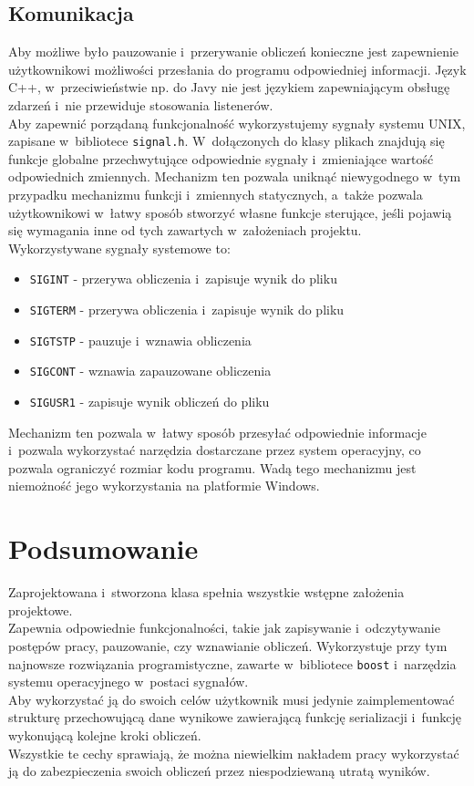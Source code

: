 \documentclass[a4paper]{article}
\begin{document}
\subsection{Komunikacja}
Aby możliwe było pauzowanie i~przerywanie obliczeń konieczne jest zapewnienie użytkownikowi możliwości przesłania do programu odpowiedniej informacji.
Język C++, w~przeciwieństwie np. do Javy nie jest językiem zapewniającym obsługę zdarzeń i~nie przewiduje stosowania listenerów.\\
Aby zapewnić porządaną funkcjonalność wykorzystujemy sygnały systemu UNIX, zapisane w~bibliotece \texttt{signal.h}.
W~dołączonych do klasy plikach znajdują się funkcje globalne przechwytujące odpowiednie sygnały i~zmieniające wartość odpowiednich zmiennych.
Mechanizm ten pozwala uniknąć niewygodnego w~tym przypadku mechanizmu funkcji i~zmiennych statycznych, a~także pozwala użytkownikowi w~łatwy sposób stworzyć własne funkcje sterujące, jeśli pojawią się wymagania inne od tych zawartych w~założeniach projektu.\\
Wykorzystywane sygnały systemowe to:
\begin{itemize}
\item \texttt{SIGINT} - przerywa obliczenia i~zapisuje wynik do pliku
\item \texttt{SIGTERM} - przerywa obliczenia i~zapisuje wynik do pliku
\item \texttt{SIGTSTP} - pauzuje i~wznawia obliczenia
\item \texttt{SIGCONT} - wznawia zapauzowane obliczenia
\item \texttt{SIGUSR1} - zapisuje wynik obliczeń do pliku
\end{itemize}
Mechanizm ten pozwala w~łatwy sposób przesyłać odpowiednie informacje i~pozwala wykorzystać narzędzia dostarczane przez system operacyjny, co pozwala ograniczyć rozmiar kodu programu.
Wadą tego mechanizmu jest niemożność jego wykorzystania na platformie Windows. 

\section{Podsumowanie}
Zaprojektowana i~stworzona klasa spełnia wszystkie wstępne założenia projektowe.\\
Zapewnia odpowiednie funkcjonalności, takie jak zapisywanie i~odczytywanie postępów pracy, pauzowanie, czy wznawianie obliczeń.
Wykorzystuje przy tym najnowsze rozwiązania programistyczne, zawarte w~bibliotece \texttt{boost} i~narzędzia systemu operacyjnego w~postaci sygnałów.\\
Aby wykorzystać ją do swoich celów użytkownik musi jedynie zaimplementować strukturę przechowującą dane wynikowe zawierającą funkcję serializacji i~funkcję wykonującą kolejne kroki obliczeń.\\
Wszystkie te cechy sprawiają, że można niewielkim nakładem pracy wykorzystać ją do zabezpieczenia swoich obliczeń przez niespodziewaną utratą wyników.
\end{document}
